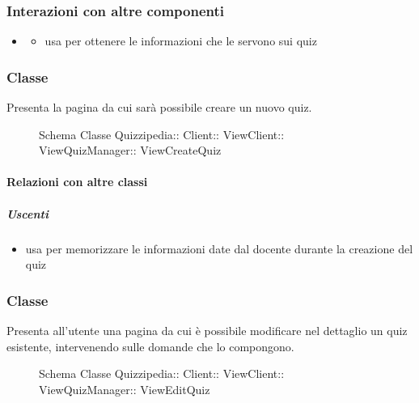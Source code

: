 \subsubsection{Interazioni con altre componenti}
\begin{itemize}
\item {}
\begin{itemize}
\item usa  per ottenere le informazioni che le servono sui quiz
\end{itemize}
\end{itemize}
\subsubsection{Classe }
Presenta la pagina da cui sarà possibile creare un nuovo quiz.
\begin{figure}[H]
\centering
\noindent{}
\caption[Schema Classe ViewCreateQuiz]{Schema Classe Quizzipedia:: Client:: ViewClient:: ViewQuizManager:: ViewCreateQuiz}
\end{figure}
\paragraph{Relazioni con altre classi}
\subparagraph{Uscenti}
\begin{itemize}
\item usa  per memorizzare le informazioni date dal docente durante la creazione del quiz
\end{itemize}
\subsubsection{Classe }
Presenta all'utente una pagina da cui è possibile modificare nel dettaglio un quiz esistente, intervenendo sulle domande che lo compongono.
\begin{figure}[H]
\centering
\noindent{}
\caption[Schema Classe ViewEditQuiz]{Schema Classe Quizzipedia:: Client:: ViewClient:: ViewQuizManager:: ViewEditQuiz}
\end{figure}
